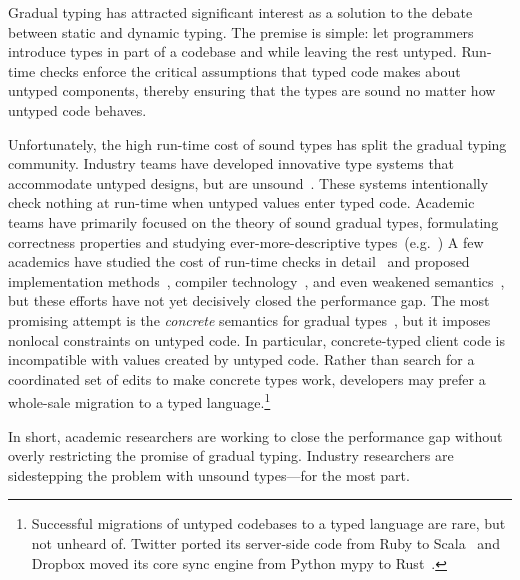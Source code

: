 \documentclass[english,cleveref,submission]{programming}
\begin{document}
Gradual typing has attracted significant interest as a solution to
the debate between static and dynamic typing.
The premise is simple: let programmers introduce types in part of a
codebase and while leaving the rest untyped.
Run-time checks enforce the critical assumptions that typed code makes about
untyped components, thereby ensuring that the types are sound no matter how
untyped code behaves.

Unfortunately, the high run-time cost of sound types has split
the gradual typing community.
Industry teams have developed innovative type systems that accommodate
untyped designs, but are unsound~\cite{bat-ecoop-2014,rch-popl-2012,cvgrl-oopsla-2017}.
These systems intentionally check nothing at run-time when untyped values enter
typed code.
Academic teams have primarily focused on the theory of sound
gradual types, formulating correctness properties and studying ever-more-descriptive
types~(e.g.~\cite{sgt-jfp-2016,clps-popl-2019,nla-popl-2019,mgt-oopsla-2021})
A few academics have studied the cost of run-time checks
in detail~\cite{tfgnvf-popl-2016,gtnffvf-jfp-2019}
and proposed implementation methods~\cite{kas-pldi-2019,bbst-oopsla-2017},
compiler technology~\cite{vsc-dls-2019,fgsfs-oopsla-2018},
and even weakened semantics~\cite{glfd-pj-2022,vss-popl-2017,gi-scp-2020},
but these efforts have not yet decisively closed the performance gap.
The most promising attempt is the \emph{concrete} semantics
for gradual types~\cite{clzv-ecoop-2018,mt-oopsla-2017,wzlov-popl-2010}, but it imposes nonlocal
constraints on untyped code.
In particular, concrete-typed client code is incompatible with
values created by untyped code.
Rather than search for a coordinated set of edits to make concrete
types work, developers may prefer a whole-sale migration to
a typed language.\footnote{Successful migrations of untyped codebases
to a typed language are rare, but not unheard of.
Twitter ported its server-side code from Ruby to Scala~\cite{twitter-scala}
and Dropbox moved its core sync engine from Python mypy to Rust~\cite{dropbox-rust}.}

In short, academic researchers are working to close the performance gap
without overly restricting the promise of gradual typing.
Industry researchers are sidestepping the problem with unsound types---for the most part.
\end{document}
